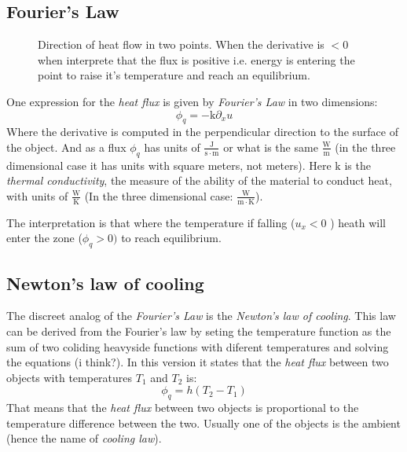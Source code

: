 \documentclass[../pde.tex]{subfiles}
\begin{document}
    \subsection{\sffamily Fourier's Law}
     \begin{figure}[ht]
        \centering
        \caption{Direction of heat flow in two points. When the derivative is $<0$ when interprete that the flux is positive i.e.
        energy is entering the point to raise it's temperature and reach an equilibrium.}
        \label{fig:heat-flow}
    \end{figure}
    
    One expression for the \emph{heat flux} is given by \emph{Fourier's Law} in two dimensions:
    \begin{equation}\label{furier-law}
        \phi_{q} = -\mathrm{k} \partial_{x} u
    \end{equation}
    Where the derivative is computed in the perpendicular direction to the surface of the object. 
    And as a flux $\phi _{q}$ has units of $\mathrm{\frac{J}{s \cdot m}}$ or what is the same $\mathrm{\frac{W}{m}}$ (in the three
    dimensional case it has units with square meters, not meters). Here $\mathrm{k}$ is the \emph{thermal conductivity}, the measure
    of the ability of the material to conduct heat, with units of $\mathrm{\frac{W}{K}}$ (In the three dimensional case:
    $\mathrm{\frac{W}{m\cdot K}}$).
    
    The interpretation is that where the temperature if falling ($u_{x}<0$ ) heath will enter the zone ($\phi_{q} > 0)$  to reach 
    equilibrium.

   
    
    \subsection{\sffamily Newton's law of cooling}
    The discreet analog of the \emph{Fourier's Law}  is the \emph{Newton's law of cooling}. This law can be derived from the
    Fourier's law by seting the temperature function as the sum of two coliding heavyside functions with diferent temperatures and
    solving the equations (i think?). In this version it states that the \emph{heat flux} between two objects with temperatures
    $T_{1}$ and $T_{2}$ is:
    \begin{equation}\label{newton-cooling}
        \phi_{q} = h(T_{2}-T_{1})
    \end{equation}
    That means that the \emph{heat flux}  between two objects is proportional to the temperature difference between the two.
    Usually one of the objects is the ambient (hence the name of \emph{cooling law}).
\end{document}
